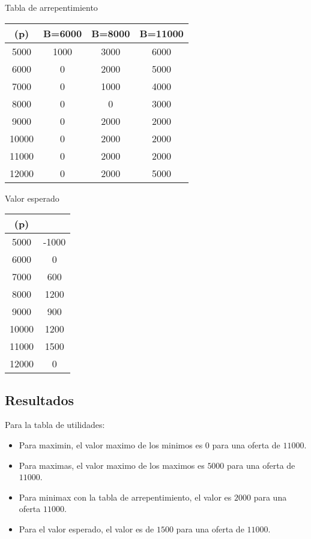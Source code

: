 \documentclass{article}
\begin{document}
Tabla de arrepentimiento

\begin{tabular}{c|ccc}
	\text{Oferta de Alden } (p) & B=6000 & B=8000 & B=11000 \\
	\hline
	5000                        & 1000   & 3000   & 6000    \\
	6000                        & 0      & 2000   & 5000    \\
	7000                        & 0      & 1000   & 4000    \\
	8000                        & 0      & 0      & 3000    \\
	9000                        & 0      & 2000   & 2000    \\
	10000                       & 0      & 2000   & 2000    \\
	11000                       & 0      & 2000   & 2000    \\
	12000                       & 0      & 2000   & 5000    \\
\end{tabular}

Valor esperado

\begin{tabular}{c|c}
	\text{Oferta de Alden } (p) & \text{Valor esperado} \\
	\hline
	5000                        & -1000                 \\
	6000                        & 0                     \\
	7000                        & 600                   \\
	8000                        & 1200                  \\
	9000                        & 900                   \\
	10000                       & 1200                  \\
	11000                       & 1500                  \\
	12000                       & 0                     \\
\end{tabular}

\subsection*{Resultados}

Para la tabla de utilidades:
\begin{itemize}
	\item Para maximin, el valor maximo de los minimos es $0$ para una oferta de $11000$.
	\item Para maximas, el valor maximo de los maximos es $5000$ para una oferta de $11000$.
	\item Para minimax con la tabla de arrepentimiento, el valor es $2000$ para una oferta $11000$.
	\item Para el valor esperado, el valor es de $1500$ para una oferta de $11000$.
\end{itemize}
\end{document}
